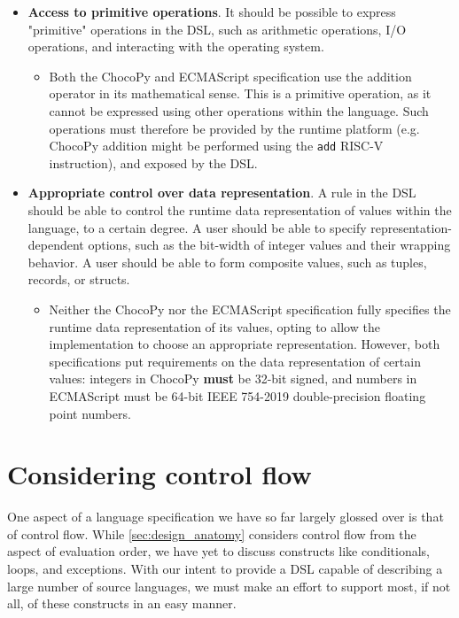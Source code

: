 \begin{itemize}
\begin{itemize}
  \end{itemize}
  \item \textbf{Access to primitive operations}. It should be possible to express "primitive" operations in the \ac{DSL}, such as arithmetic operations, I/O operations, and interacting with the operating system.
  \begin{itemize}
    \item Both the ChocoPy and ECMAScript specification use the addition operator in its mathematical sense. This is a primitive operation, as it cannot be expressed using other operations within the language. Such operations must therefore be provided by the runtime platform (e.g. ChocoPy addition might be performed using the \texttt{add} RISC-V instruction), and exposed by the \ac{DSL}.
  \end{itemize}
  \item \textbf{Appropriate control over data representation}. A rule in the \ac{DSL} should be able to control the runtime data representation of values within the language, to a certain degree. A user should be able to specify representation-dependent options, such as the bit-width of integer values and their wrapping behavior. A user should be able to form composite values, such as tuples, records, or structs.
  \begin{itemize}
    \item Neither the ChocoPy nor the ECMAScript specification fully specifies the runtime data representation of its values, opting to allow the implementation to choose an appropriate representation. However, both specifications put requirements on the data representation of certain values: integers in ChocoPy \textbf{must} be 32-bit signed, and numbers in ECMAScript must be 64-bit IEEE 754-2019 \cite{8766229} double-precision floating point numbers.
  \end{itemize}
\end{itemize}




\section{Considering control flow}
\label{sec:design_control_flow}
One aspect of a language specification we have so far largely glossed over is that of control flow. While \cref{sec:design_anatomy} considers control flow from the aspect of evaluation order, we have yet to discuss constructs like conditionals, loops, and exceptions. With our intent to provide a \ac{DSL} capable of describing a large number of source languages, we must make an effort to support most, if not all, of these constructs in an easy manner.

